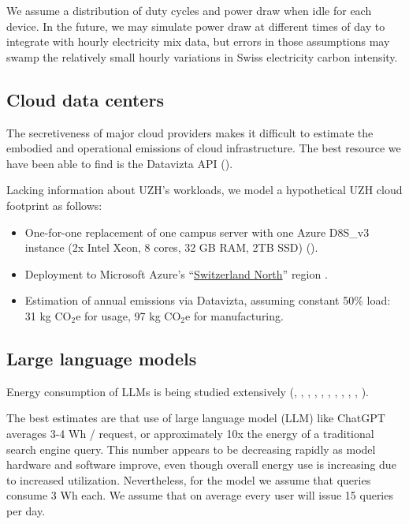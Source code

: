 \documentclass[11pt]{article}
\begin{document}
We assume a distribution of duty cycles and power draw when idle for each device.
In the future, we may simulate power draw at different times of day to integrate with
hourly electricity mix data, but errors in those assumptions may swamp the relatively small
hourly variations in Swiss electricity carbon intensity.

\subsection{Cloud data centers}
\label{sec:cloud_data_centers}

The secretiveness of major cloud providers makes it difficult to estimate the embodied and operational emissions of cloud
infrastructure. The best resource we have been able to find is the Datavizta API (\cite{boavizta}).

Lacking information about UZH's workloads, we model a hypothetical UZH cloud footprint as follows:
\begin{itemize}
    \item One-for-one replacement of one campus server with one Azure D8S\_v3 instance (2x Intel
      Xeon, 8 cores, 32 GB RAM, 2TB SSD) (\cite{msftvms}).
    \item Deployment to Microsoft Azure's ``\href{https://datacenters.microsoft.com/globe/explore?info=region_switzerlandnorth}{Switzerland North}'' region .
    \item Estimation of annual emissions via Datavizta, assuming constant 50\% load: 31 kg CO$_2$e for usage,
      97 kg CO$_2$e for manufacturing.
\end{itemize}

\subsection{Large language models}

Energy consumption of LLMs is being studied extensively (\cite{budennyy2022eco2ai},
\cite{castano2023exploring},
\cite{devries2023growing},
\cite{gowda2024watt},
\cite{harding2024watts},
\cite{heguerte2023estimate},
\cite{luccioni2022estimating},
\cite{luccioni2023counting},
\cite{patterson2021carbon},
\cite{rodriguez2024evaluating},
\cite{tripp2024measuring}).

The best estimates are that use of large language model (LLM) like ChatGPT averages 3-4 Wh / request,
or approximately 10x the energy of a traditional search engine query. This number appears to be decreasing
rapidly as model hardware and software improve, even though overall energy use is increasing due to
increased utilization. Nevertheless, for the model we assume that queries consume 3 Wh each.
We assume that on average every user will issue 15 queries per day.
\end{document}
